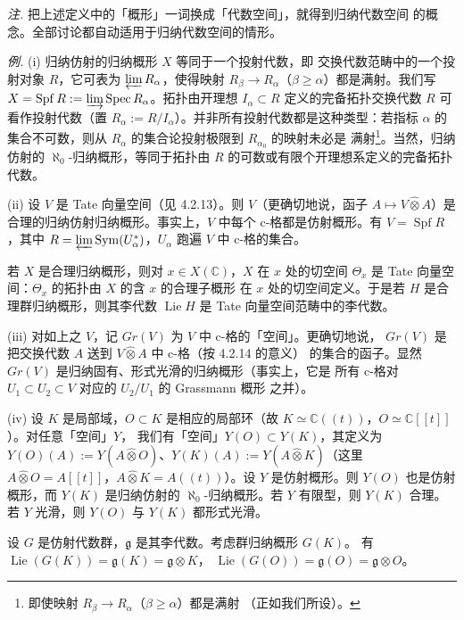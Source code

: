 
\emph{注.} 把上述定义中的「概形」一词换成「代数空间」，就得到归纳代数空间
的概念。全部讨论都自动适用于归纳代数空间的情形。

 \emph{例.} (i) 归纳仿射的归纳概形 $X$ 等同于一个投射代数，即
交换代数范畴中的一个投射对象 $R$，它可表为 $\varprojlim R_\alpha$，使得映射
$R_\beta\to R_\alpha$（$\beta\ge\alpha$）都是满射。我们写
$X=\operatorname{Spf}R:=\varinjlim\operatorname{Spec}R_\alpha$。拓扑由开理想
$I_\alpha\subset R$ 定义的完备拓扑交换代数 $R$ 可看作投射代数（置
$R_\alpha:=R/I_\alpha$）。并非所有投射代数都是这种类型：若指标 $\alpha$ 的
集合不可数，则从 $R_\alpha$ 的集合论投射极限到 $R_{\alpha_0}$ 的映射未必是
满射\footnote{即使映射 $R_\beta\to R_\alpha$（$\beta\ge\alpha$）都是满射
（正如我们所设）。}。当然，归纳仿射的 $\aleph_0$-归纳概形，等同于拓扑由
$R$ 的可数或有限个开理想系定义的完备拓扑代数。

(ii) 设 $V$ 是 Tate 向量空间（见 4.2.13）。则 $V$（更确切地说，函子
$A\mapsto V\hat\otimes A$）是合理的归纳仿射归纳概形。事实上，$V$ 中每个
c-格都是仿射概形。有 $V=\operatorname{Spf}R$，其中
$R=\varprojlim\operatorname{Sym}(U_\alpha^*)$，$U_\alpha$ 跑遍 $V$ 中
c-格的集合。

若 $X$ 是合理归纳概形，则对 $x\in X(\mathbb{C})$，$X$ 在 $x$ 处的切空间
$\Theta_x$ 是 Tate 向量空间：$\Theta_x$ 的拓扑由 $X$ 的含 $x$ 的合理子概形
在 $x$ 处的切空间定义。于是若 $H$ 是合理群归纳概形，则其李代数
$\operatorname{Lie}H$ 是 Tate 向量空间范畴中的李代数。

(iii) 对如上之 $V$，记 $Gr(V)$ 为 $V$ 中 c-格的「空间」。更确切地说，
$Gr(V)$ 是把交换代数 $A$ 送到 $V\hat\otimes A$ 中 c-格（按 4.2.14 的意义）
的集合的函子。显然 $Gr(V)$ 是归纳固有、形式光滑的归纳概形（事实上，它是
所有 c-格对 $U_1\subset U_2\subset V$ 对应的 $U_2/U_1$ 的 Grassmann 概形
之并）。


(iv) 设 $K$ 是局部域，$O\subset K$ 是相应的局部环（故
$K\simeq\mathbb{C}((t))$，$O\simeq\mathbb{C}[[t]]$）。对任意「空间」$Y$，
我们有「空间」$Y(O)\subset Y(K)$，其定义为 $Y(O)(A):=
Y(A\hat\otimes O)$、$Y(K)(A):=Y(A\hat\otimes K)$（这里
$A\hat\otimes O=A[[t]]$，$A\hat\otimes K=A((t))$）。设 $Y$ 是仿射概形。则
$Y(O)$ 也是仿射概形，而 $Y(K)$ 是归纳仿射的 $\aleph_0$-归纳概形。若 $Y$
有限型，则 $Y(K)$ 合理。若 $Y$ 光滑，则 $Y(O)$ 与 $Y(K)$ 都形式光滑。

设 $G$ 是仿射代数群，$\mathfrak{g}$ 是其李代数。考虑群归纳概形 $G(K)$。
有 $\operatorname{Lie}(G(K))=\mathfrak{g}(K)=\mathfrak{g}\otimes K$，
$\operatorname{Lie}(G(O))=\mathfrak{g}(O)=\mathfrak{g}\otimes O$。

